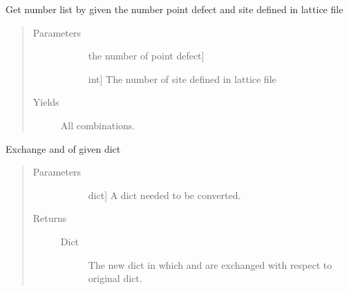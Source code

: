 \documentclass[letterpaper,10pt,english]{sphinxmanual}
\begin{document}
\begin{fulllineitems}
\label{\detokenize{pygace:pygace.utility.get_num_lis}}
\sphinxAtStartPar
Get number list by given the number point defect and site defined in
lattice file
\begin{quote}\begin{description}
\item[{Parameters}] \leavevmode\begin{description}
\item[{}] \leavevmode{[}the number of point defect{]}
\item[{}] \leavevmode{[}int{]}
\sphinxAtStartPar
The number of site defined in lattice file

\end{description}

\item[{Yields}] \leavevmode\begin{description}
\item[{All combinations.}] \leavevmode
\end{description}

\end{description}\end{quote}

\end{fulllineitems}


\begin{fulllineitems}
\label{\detokenize{pygace:pygace.utility.reverse_dict}}
\sphinxAtStartPar
Exchange  and  of given dict
\begin{quote}\begin{description}
\item[{Parameters}] \leavevmode\begin{description}
\item[{}] \leavevmode{[}dict{]}
\sphinxAtStartPar
A dict needed to be converted.

\end{description}

\item[{Returns}] \leavevmode\begin{description}
\item[{Dict}] \leavevmode
\sphinxAtStartPar
The new dict in which  and  are exchanged with respect to
original dict.

\end{description}

\end{description}\end{quote}

\end{fulllineitems}
\end{document}
